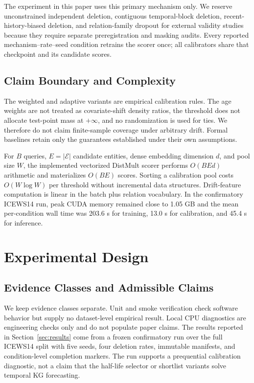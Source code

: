 \documentclass[10pt,twocolumn]{article}
\begin{document}
The experiment in this paper uses this primary mechanism only. We
reserve unconstrained independent deletion, contiguous temporal-block deletion,
recent-history-biased deletion, and relation-family dropout for external
validity studies because they require separate preregistration and masking
audits. Every reported mechanism--rate--seed condition retrains the scorer once;
all calibrators share that checkpoint and its candidate scores.

\subsection{Claim Boundary and Complexity}

The weighted and adaptive variants are empirical calibration rules. The age
weights are not treated as covariate-shift density ratios, the threshold does
not allocate test-point mass at \(+\infty\), and no randomization is used for
ties. We therefore do not claim finite-sample coverage under arbitrary drift.
Formal baselines retain only the guarantees established under their own
assumptions.

For \(B\) queries, \(E=|\mathcal{E}|\) candidate entities, dense embedding
dimension \(d\), and pool size \(W\), the implemented vectorized DistMult scorer
performs \(O(BEd)\) arithmetic and materializes \(O(BE)\) scores. Sorting a
calibration pool costs \(O(W\log W)\) per threshold without incremental data
structures. Drift-feature computation is linear in the batch plus relation
vocabulary. In the confirmatory ICEWS14 run, peak CUDA memory remained close to
1.05 GB and the mean per-condition wall time was 203.6 s for training, 13.0 s
for calibration, and 45.4 s for inference.

\section{Experimental Design}
\label{sec:experiments}

\subsection{Evidence Classes and Admissible Claims}

We keep evidence classes separate. Unit and smoke verification check software
behavior but supply no dataset-level empirical result. Local CPU diagnostics are
engineering checks only and do not populate paper claims. The results
reported in Section~\ref{sec:results} come from a frozen confirmatory run over
the full ICEWS14 split with five seeds, four deletion rates, immutable
manifests, and condition-level completion markers. The run supports a
prequential calibration diagnostic, not a claim that the half-life selector or
shortlist variants solve temporal KG forecasting.
\end{document}

